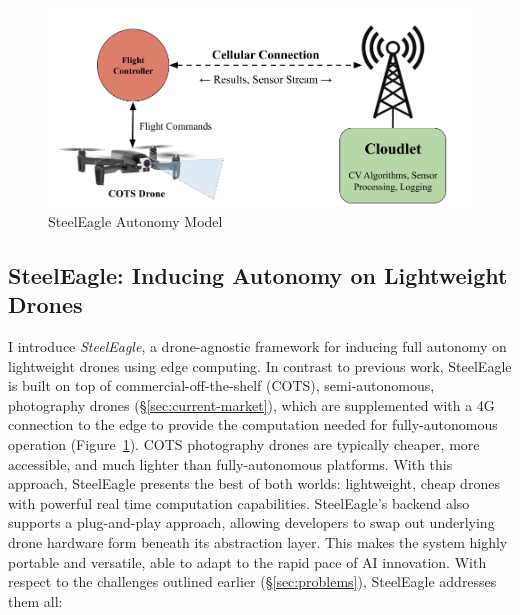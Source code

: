 \begin{figure}
    \centering
    \includegraphics[width=1.0\linewidth]{chapter2/FIGS/simplearch.png}
    \caption{SteelEagle Autonomy Model}
    \label{fig:steeleagle-model}
\end{figure}

\subsection{SteelEagle: Inducing Autonomy on Lightweight Drones}
I introduce \textit{SteelEagle}, a drone-agnostic framework for inducing full autonomy on lightweight drones using edge computing. In contrast to previous work, SteelEagle is built on top of commercial-off-the-shelf (COTS), semi-autonomous, photography drones (\S\ref{sec:current-market}), which are supplemented with a 4G~\cite{ETSI} connection to the edge to provide the computation needed for fully-autonomous operation (Figure~\ref{fig:steeleagle-model}). COTS photography drones are typically cheaper, more accessible, and much lighter than fully-autonomous platforms. With this approach, SteelEagle presents the best of both worlds: lightweight, cheap drones with powerful real time computation capabilities. SteelEagle's backend also supports a plug-and-play approach, allowing developers to swap out underlying drone hardware form beneath its abstraction layer. This makes the system highly portable and versatile, able to adapt to the rapid pace of AI innovation. With respect to the challenges outlined earlier (\S\ref{sec:problems}), SteelEagle addresses them all:

